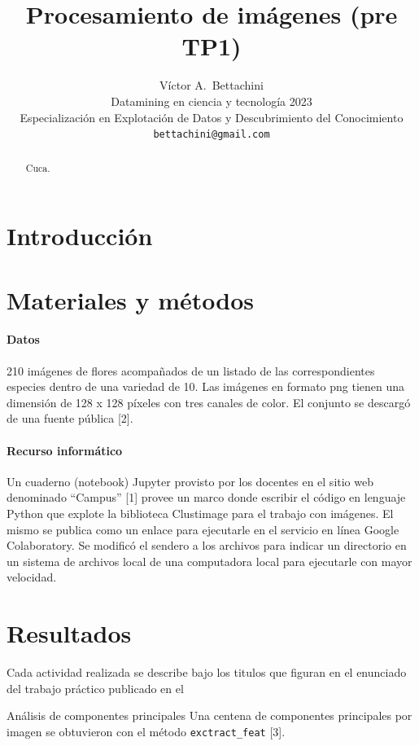 \documentclass{article}
\title{Procesamiento de imágenes (pre TP1)}
\author{
  Víctor A.~Bettachini\\ %
  Datamining en ciencia y tecnología 2023\\
  Especialización en Explotación de Datos y Descubrimiento del Conocimiento\\
  \texttt{bettachini@gmail.com}
}
\begin{document}
\maketitle


\begin{abstract}
Cuca.
\end{abstract}


\section{Introducción}

\section{Materiales y métodos}

\paragraph{Datos}
210 imágenes de flores acompañados de un listado de las correspondientes especies dentro de una variedad de 10.
Las imágenes en formato png tienen una dimensión de 128 x 128 píxeles con tres canales de color.
El conjunto se descargó de una fuente pública [2].

\paragraph{Recurso informático} 
Un cuaderno (notebook) Jupyter provisto por los docentes en el sitio web denominado ``Campus'' [1] provee un marco donde escribir el código en lenguaje Python que explote la biblioteca Clustimage para el trabajo con imágenes.
El mismo se publica como un enlace para ejecutarle en el servicio en línea Google Colaboratory.
Se modificó el sendero a los archivos para indicar un directorio en un sistema de archivos local de una computadora local para ejecutarle con mayor velocidad.


\section{Resultados}
Cada actividad realizada se describe bajo los titulos que figuran en el enunciado del trabajo práctico publicado en el


Análisis de componentes principales
Una centena de componentes principales por imagen se obtuvieron con el método \verb'exctract_feat' [3].
\end{document}
